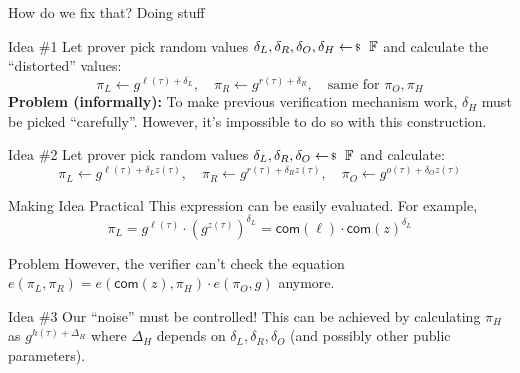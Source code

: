 \documentclass{zkdl-presentation-template}
\begin{document}
    \begin{frame}{How do we fix that? Doing stuff}
        \begin{block}{Idea \#1}
            Let prover pick random values $\delta_L, \delta_R, \delta_O, \delta_H \leftarrowS \mathbb{F}$ and calculate the ``distorted'' values:
            \begin{equation*}
                \pi_L \gets g^{\ell(\tau) + \delta_L}, \quad \pi_R \gets g^{r(\tau) + \delta_R}, \quad \text{same for $\pi_O, \pi_H$}
            \end{equation*}
            \pause\textbf{Problem (informally):} To make previous verification mechanism work, $\delta_H$ must be picked ``carefully''. However, it's impossible to do so with this construction.
        \end{block}
        \pause

        \begin{block}{Idea \#2}
            Let prover pick random values $\delta_L, \delta_R, \delta_O \leftarrowS \mathbb{F}$ and calculate:
            \begin{equation*}
                \pi_L \gets g^{\ell(\tau) + \delta_L z(\tau)}, \quad \pi_R \gets g^{r(\tau) + \delta_R z(\tau)}, \quad \pi_O \gets g^{o(\tau) + \delta_O z(\tau)}
            \end{equation*}
        \end{block}
    \end{frame}

    \begin{frame}{Making Idea Practical}
        This expression can be easily evaluated. For example,
        \begin{equation*}
            \pi_L = g^{\ell(\tau)} \cdot \left(g^{z(\tau)}\right)^{\delta_L} = \mathsf{com}(\ell) \cdot \mathsf{com}(z)^{\delta_L}
        \end{equation*}
        \pause

        \begin{alertblock}{Problem}
            However, the verifier can't check the equation $e(\pi_L, \pi_R) = e(\mathsf{com}(z), \pi_H) \cdot e(\pi_O, g)$ anymore.
        \end{alertblock}
        \pause

        \begin{block}{Idea \#3}
            Our ``noise'' must be controlled! This can be achieved by calculating $\pi_H$ as $g^{h(\tau) + \Delta_H}$ where $\Delta_H$ depends on $\delta_L, \delta_R, \delta_O$ (and possibly other public parameters).
        \end{block}
    \end{frame}
\end{document}
